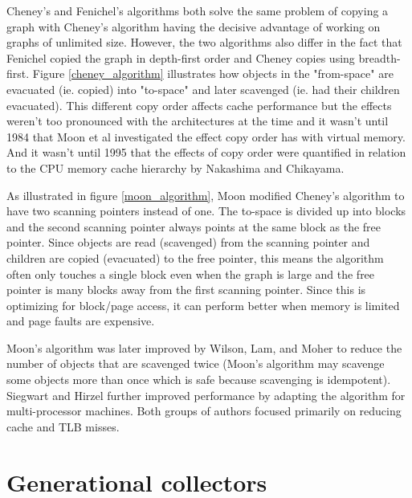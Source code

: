\documentclass[a4paper,oneside]{memoir}
\begin{document}
Cheney's and Fenichel's algorithms both solve the same problem of copying a graph
with Cheney's algorithm having the decisive advantage of working on graphs of
unlimited size. However, the two algorithms also differ in the fact that Fenichel
copied the graph in depth-first order and Cheney copies using breadth-first.
Figure \ref{cheney_algorithm} illustrates how objects in the "from-space"
are evacuated (ie. copied) into "to-space" and later scavenged (ie. had their
children evacuated).
This
different copy order affects cache performance but the effects weren't too pronounced
with the architectures at the time and it wasn't until 1984 that Moon et al
investigated the effect copy order has with virtual memory. And it wasn't until
1995 that the effects of copy order were quantified in relation to the
CPU memory cache hierarchy by Nakashima and Chikayama.\cite{Nakashima:1995}

As illustrated in figure \ref{moon_algorithm}, Moon modified Cheney's algorithm to have two scanning pointers instead of one.\cite{Moon:1984}
The to-space is divided up into blocks and the second scanning pointer always
points at the same block as the free pointer. Since objects are read (scavenged)
from the scanning pointer and children are copied (evacuated) to the free pointer,
this means the algorithm often only touches a single block even when the graph
is large and the free pointer is many blocks away from the first scanning pointer.
Since this is optimizing for block/page access, it can perform better when memory
is limited and page faults are expensive.

Moon's algorithm was later improved by Wilson, Lam, and Moher to reduce the
number of objects that are scavenged twice (Moon's algorithm may scavenge
some objects more than once which is safe because scavenging is idempotent).
\cite{Lam:1992}
Siegwart and Hirzel further improved performance by adapting the algorithm for
multi-processor machines.\cite{Siegwart:2006} Both groups of authors focused primarily on reducing
cache and TLB misses.

\section{Generational collectors}
\end{document}
